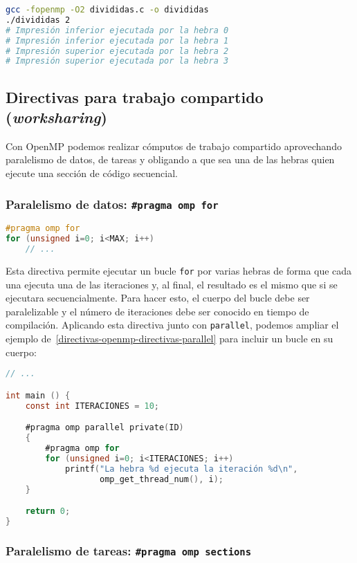 \begin{lstlisting}[language=sh]
gcc -fopenmp -O2 divididas.c -o divididas
./divididas 2
# Impresión inferior ejecutada por la hebra 0
# Impresión inferior ejecutada por la hebra 1
# Impresión superior ejecutada por la hebra 2
# Impresión superior ejecutada por la hebra 3
\end{lstlisting}

\subsection{Directivas para trabajo compartido (\textit{worksharing})}\label{directivas-openmp-directivas-trabajo-compartido}

Con OpenMP podemos realizar cómputos de trabajo compartido aprovechando paralelismo de datos, de tareas y obligando a que sea una de las hebras quien ejecute una sección de código secuencial.

\subsubsection{Paralelismo de datos: \texttt{\#pragma omp for}}

\begin{lstlisting}[language=C]
#pragma omp for
for (unsigned i=0; i<MAX; i++)
	// ...
\end{lstlisting}

Esta directiva permite ejecutar un bucle \texttt{for} por varias hebras de forma que cada una ejecuta una de las iteraciones y, al final, el resultado es el mismo que si se ejecutara secuencialmente.
Para hacer esto, el cuerpo del bucle debe ser paralelizable y el número de iteraciones debe ser conocido en tiempo de compilación.
Aplicando esta directiva junto con \texttt{parallel}, podemos ampliar el ejemplo de~\ref{directivas-openmp-directivas-parallel} para incluir un bucle en su cuerpo:

\begin{lstlisting}[language=C]
// ...

int main () {
	const int ITERACIONES = 10;

	#pragma omp parallel private(ID)
	{
		#pragma omp for
		for (unsigned i=0; i<ITERACIONES; i++)
			printf("La hebra %d ejecuta la iteración %d\n",
			       omp_get_thread_num(), i);
	}

	return 0;
}
\end{lstlisting}

\subsubsection{Paralelismo de tareas: \texttt{\#pragma omp sections}}

